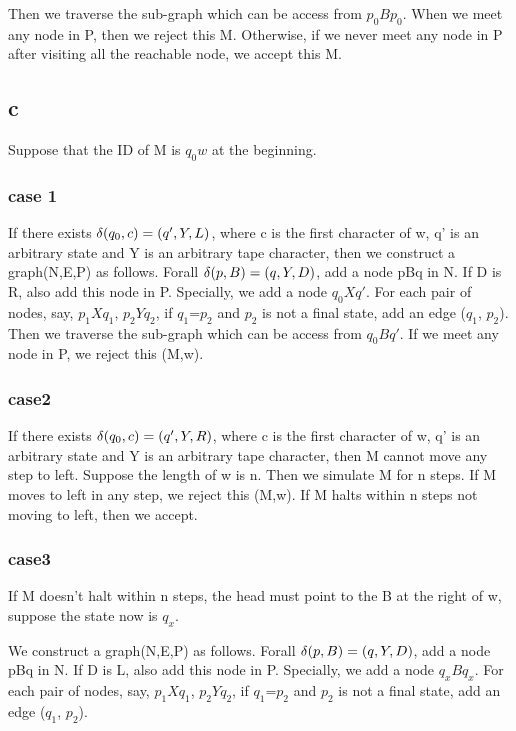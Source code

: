 \documentclass[a4paper,UTF8]{ctexart}
\theoremstyle{definition}
\begin{document}
Then we traverse the sub-graph which can be access from $p_0Bp_0$. When we meet any node in P, then 
we reject this M. Otherwise, if we never meet any node in P after visiting all the reachable 
node, we accept this M.


\subsection*{c}
Suppose that the ID of M is $q_0w$ at the beginning.

\subsubsection*{case 1}
If there exists
$\delta(q_0,c)=(q',Y,L)$, where c is the first character of w, q' is an arbitrary
state and Y is an arbitrary tape character, then we construct a graph(N,E,P) as follows.
Forall $\delta(p,B)=(q,Y,D)$, add a node pBq in N. If D is R, also add this node in P.
Specially, we add a node $q_0Xq'$.  For each pair of nodes, say, $p_1Xq_1$, $p_2Yq_2$, 
if $q_1$=$p_2$ and $p_2$ is not a final state, add an edge ($q_1$, $p_2$). \\

Then we traverse the sub-graph which can be access from $q_0Bq'$. If we meet any node in P,
we reject this (M,w).

\subsubsection*{case2}
If there exists $\delta(q_0,c)=(q',Y,R)$, where c is the first character of w, q' is an arbitrary
state and Y is an arbitrary tape character, then M cannot move any step to left.
Suppose the length of w is n. Then we simulate M for n steps.  
If M moves to left in any step, we reject this (M,w).
If M halts within n steps not moving to left, then we accept.

\subsubsection*{case3}
If M doesn't halt within n steps, the head must point to the B at the right of w,
 suppose the state now is $q_x$.

We construct a graph(N,E,P) as follows.
Forall $\delta(p,B)=(q,Y,D)$, add a node pBq in N. If D is L, also add this node in P.
Specially, we add a node $q_xBq_x$.  For each pair of nodes, say, $p_1Xq_1$, $p_2Yq_2$, 
if $q_1$=$p_2$ and $p_2$ is not a final state, add an edge ($q_1$, $p_2$). \\
\end{document}
